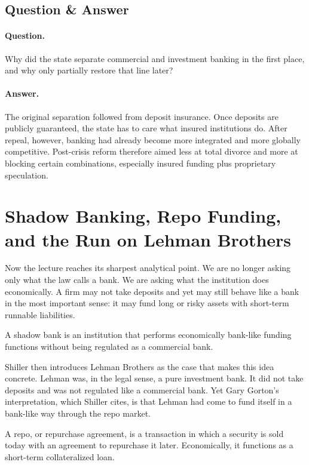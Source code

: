 \subsection{Question \& Answer}

\paragraph{Question.} Why did the state separate commercial and investment banking in the first place, and why only partially restore that line later?

\paragraph{Answer.} The original separation followed from deposit insurance. Once deposits are publicly guaranteed, the state has to care what insured institutions do. After repeal, however, banking had already become more integrated and more globally competitive. Post-crisis reform therefore aimed less at total divorce and more at blocking certain combinations, especially insured funding plus proprietary speculation.

\section{Shadow Banking, Repo Funding, and the Run on Lehman Brothers}

Now the lecture reaches its sharpest analytical point. We are no longer asking only what the law calls a bank. We are asking what the institution does economically. A firm may not take deposits and yet may still behave like a bank in the most important sense: it may fund long or risky assets with short-term runnable liabilities.

\begin{definition}
A shadow bank is an institution that performs economically bank-like funding functions without being regulated as a commercial bank.
\end{definition}

Shiller then introduces Lehman Brothers as the case that makes this idea concrete. Lehman was, in the legal sense, a pure investment bank. It did not take deposits and was not regulated like a commercial bank. Yet Gary Gorton's interpretation, which Shiller cites, is that Lehman had come to fund itself in a bank-like way through the repo market.

\begin{definition}
A repo, or repurchase agreement, is a transaction in which a security is sold today with an agreement to repurchase it later. Economically, it functions as a short-term collateralized loan.
\end{definition}

